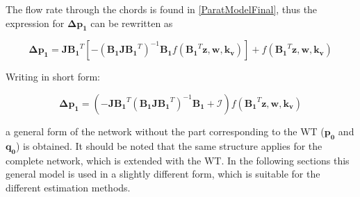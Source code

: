 The flow rate through the chords is found in \eqref{ParatModelFinal}, thus the expression for $ \bm{\Delta p_1} $ can be rewritten as

\begin{equation}
 \bm{ \Delta p_1} = \bm{ J {B_1}}^T [- (\bm{B_1 J {B_1}}^T)^{-1}\bm{B_1} f({\bm{B_1}}^T \bm{z},\bm{ w}, \bm{k_v})] + f({\bm{B_1}}^T \bm{z},\bm{ w}, \bm{k_v})
  \label{PressureLarge}
 \end{equation}
 
Writing in short form:
 
 \begin{equation}
  \bm{\Delta p_1} =  (-\bm{J {B_1}}^T (\bm{B_1 J {B_1}}^T)^{-1}\bm{B_1} + \bm{\mathcal{I}}) f({\bm{B_1}}^T \bm{z}, \bm{w}, \bm{k_v})
  \label{PressureShort}
 \end{equation}

a general form of the network without the part corresponding to the WT ($\bm{p_0}$ and $\bm{q_0}$) is obtained. It should be noted that the same structure applies for the complete network, which is extended with the WT. In the following sections this general model is used in a slightly different form, which is suitable for the different estimation methods. 


